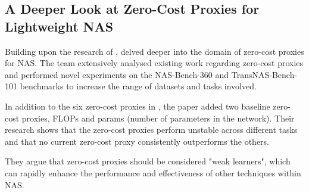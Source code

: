 \subsection{A Deeper Look at Zero-Cost Proxies for Lightweight NAS}

Building upon the research of \cite{abdelfattah2021zero}, \cite{colin2022adeeperlook} delved deeper into the domain of zero-cost proxies for \gls{NAS}. The team extensively analysed existing work regarding zero-cost proxies and performed novel experiments on the NAS-Bench-360 \autocite{tu2021bench} and TransNAS-Bench-101 \autocite{duan2021transnas} benchmarks to increase the range of datasets and tasks involved.

In addition to the six zero-cost proxies in \cite{abdelfattah2021zero}, the paper added two baseline zero-cost proxies, \gls{FLOPs} and params (number of parameters in the network). Their research shows that the zero-cost proxies perform unstable across different tasks and that no current zero-cost proxy consistently outperforms the others. 

They argue that zero-cost proxies should be considered "weak learners", which can rapidly enhance the performance and effectiveness of other techniques within \gls{NAS}. 

